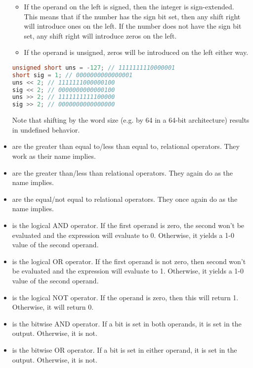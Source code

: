 \begin{itemize}
	      \begin{itemize}
		    \item If the operand on the left is signed, then the integer is sign-extended.
          This means that if the number has the sign bit set, then any shift right will introduce ones on the left.
          If the number does not have the sign bit set, any shift right will introduce zeros on the left.
		      \item If the operand is unsigned, zeros will be introduced on the left either way.
	      \end{itemize}

	      \begin{lstlisting}[language=C]
unsigned short uns = -127; // 1111111110000001
short sig = 1; // 0000000000000001
uns << 2; // 1111111000000100
sig << 2; // 0000000000000100
uns >> 2; // 1111111111100000
sig >> 2; // 0000000000000000
\end{lstlisting}
    Note that shifting by the word size (e.g. by 64 in a 64-bit architecture) results in undefined behavior.
	\item \keyword{<=/>=} are the greater than equal to/less than equal to, relational operators.
    They work as their name implies.
	\item \keyword{</>} are the greater than/less than relational operators.
    They again do as the name implies.
	\item \keyword{==/\!=} are the equal/not equal to relational operators.
    They once again do as the name implies.
	\item \keyword{\&\&} is the logical AND operator.
    If the first operand is zero, the second won't be evaluated and the expression will evaluate to 0. Otherwise, it yields a 1-0 value of the second operand.
	\item \keyword{||} is the logical OR operator.
    If the first operand is not zero, then second won't be evaluated and the expression will evaluate to 1.
    Otherwise, it yields a 1-0 value of the second operand.
	\item \keyword{!} is the logical NOT operator.
    If the operand is zero, then this will return 1.
    Otherwise, it will return 0.
	\item \keyword{\&} is the bitwise AND operator.
    If a bit is set in both operands, it is set in the output.
    Otherwise, it is not.
	\item \keyword{|} is the bitwise OR operator.
    If a bit is set in either operand, it is set in the output.
    Otherwise, it is not.

\end{itemize}
